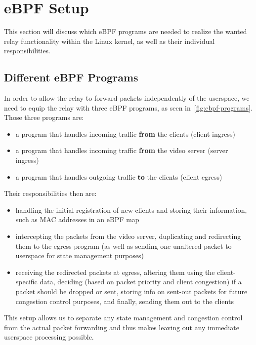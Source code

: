 \section{eBPF Setup}\label{sec:ebpf_setup}

This section will discuss which eBPF programs are needed to realize the wanted 
relay functionality within the Linux kernel, as well as their individual 
responsibilities.

\subsection{Different eBPF Programs}

In order to allow the relay to forward packets independently of the userspace, we
need to equip the relay with three eBPF programs, as seen in~\autoref{fig:ebpf-programs}.
Those three programs are:

\begin{itemize}
    \item a program that handles incoming traffic \textbf{from} the clients (client ingress)
    \item a program that handles incoming traffic \textbf{from} the video server (server ingress)
    \item a program that handles outgoing traffic \textbf{to} the clients (client egress)
\end{itemize}
Their responsibilities then are:

\begin{itemize}
    \item handling the initial registration of new clients and storing their information, such as
    MAC addresses in an eBPF map
    \item intercepting the packets from the video server, duplicating and redirecting them to 
    the egress program (as well as sending one unaltered packet to userspace for state
    management purposes)
    \item receiving the redirected packets at egress, altering them using the client-specific
    data, deciding (based on packet priority and client congestion) if a packet should be dropped 
    or sent, storing info on sent-out packets for future congestion control purposes, and finally, sending 
    them out to the clients
\end{itemize}
This setup allows us to separate any state management and congestion control from the actual
packet forwarding and thus makes leaving out any immediate userspace processing possible.

